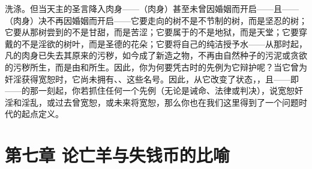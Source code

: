洗涤。但当天主的圣言降入肉身——（肉身）甚至未曾因婚姻而开启——且——（肉身）决不再因婚姻而开启——它要走向的树不是不节制的树，而是坚忍的树；它要从那树尝到的不是甘甜，而是苦涩；它要属于的不是地狱，而是天堂；它要穿戴的不是淫欲的树叶，而是圣德的花朵；它要将自己的纯洁授予水——从那时起，凡的肉身已失去其原来的污秽，如今成了新造之物，不再由自然种子的污泥或贪欲的污秽所生，而是由和所生。因此，你为何要凭古时的先例为它辩护呢？当它曾为奸淫获得宽恕时，它尚未拥有、、这些名号。因此，从它改变了状态，，且——即——的那一刻起，你若抓住任何一个先例（无论是诫命、法律或判决），说宽恕奸淫和淫乱，或过去曾宽恕，或未来将宽恕，那么你也在我们这里得到了一个问题时代的起点定义。\par


\section{第七章 论亡羊与失钱币的比喻}

